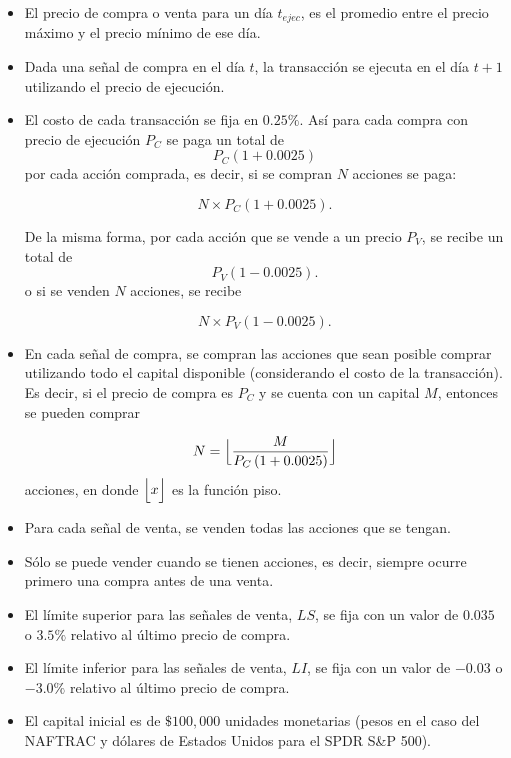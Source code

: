 \documentclass[12pt]{report}
\theoremstyle{break}
\theoremstyle{break}
\begin{document}
\begin{itemize}
\item El precio de compra o venta para un día $t_{ejec}$, es el promedio entre el precio máximo y el precio mínimo de ese día.

\item Dada una señal de compra en el día $t$, la transacción se ejecuta en el día $t+1$ utilizando el precio de ejecución.

\item El costo de cada transacción se fija en $0.25\%$. Así para cada compra con precio de ejecución $P_{C}$ se paga un total de 
$$P_{C}(1 + 0.0025)$$
por cada acción comprada, es decir, si se compran $N$ acciones se paga:

$$N \times P_{C}(1 + 0.0025).$$

De la misma forma, por cada acción que se vende a un precio $P_{V}$, se recibe un total de 
$$P_{V}(1 - 0.0025).$$
o si se venden $N$ acciones, se recibe

$$N \times P_{V}(1 - 0.0025).$$

\item En cada señal de compra, se compran las acciones que sean posible comprar utilizando todo el capital disponible (considerando el costo de la transacción). Es decir, si el precio de compra es $P_{C}$ y se cuenta con un capital $M$, entonces se pueden comprar

$$ N = \Bigl\lfloor \dfrac{M}{ P_{C} \left(1 + 0.0025 \right) } \Bigr\rfloor$$
acciones, en donde $\Bigl\lfloor x \Bigr\rfloor$ es la función piso.
\item Para cada señal de venta, se venden todas las acciones que se tengan.

\item Sólo se puede vender cuando se tienen acciones, es decir, siempre ocurre primero una compra antes de una venta.

\item El límite superior para las señales de venta, $LS$, se fija con un valor de $0.035$ o $3.5\%$ relativo al último precio de compra.

\item El límite inferior para las señales de venta, $LI$, se fija con un valor de $-0.03$ o $-3.0\%$ relativo al último precio de compra.

\item El capital inicial es de $\$100,000$ unidades monetarias (pesos en el caso del NAFTRAC y dólares de Estados Unidos para el SPDR S\&P 500).
\end{itemize}
\end{document}
